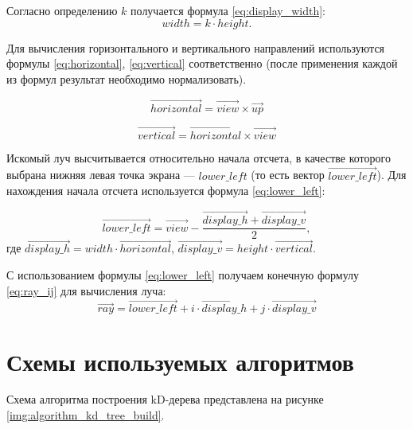 Согласно определению $k$ получается формула \ref{eq:display_width}:
\begin{equation}\label{eq:display_width}
	width = k \cdot height.
\end{equation}

Для вычисления горизонтального и вертикального направлений используются формулы \ref{eq:horizontal}, \ref{eq:vertical} соответственно (после применения каждой из формул результат необходимо нормализовать).

\begin{equation}\label{eq:horizontal}
	\overrightarrow{horizontal} = \overrightarrow{view} \times \overrightarrow{up}
\end{equation}

\begin{equation}\label{eq:vertical}
	\overrightarrow{vertical} = \overrightarrow{horizontal} \times \overrightarrow{view}
\end{equation}

Искомый луч высчитывается относительно начала отсчета, в качестве которого выбрана нижняя левая точка экрана --- $lower\_left$ (то есть вектор $\overrightarrow{lower\_left}$).
Для нахождения начала отсчета используется формула \ref{eq:lower_left}:

\begin{equation}\label{eq:lower_left}
	\overrightarrow{lower\_left} = \overrightarrow{view} - \frac{\overrightarrow{display\_h} + \overrightarrow{display\_v}}{2},
\end{equation}
где $\overrightarrow{display\_h} = width \cdot \overrightarrow{horizontal}$, $\overrightarrow{display\_v} = height \cdot \overrightarrow{vertical}$.

С использованием формулы \ref{eq:lower_left} получаем конечную формулу \ref{eq:ray_ij} для вычисления луча:
\begin{equation}\label{eq:ray_ij}
	\overrightarrow{ray} = \overrightarrow{lower\_left} + i \cdot \overrightarrow{display\_h} + j \cdot \overrightarrow{display\_v}
\end{equation}

\section{Схемы используемых алгоритмов}

Схема алгоритма построения kD-дерева представлена на рисунке \ref{img:algorithm_kd_tree_build}.


